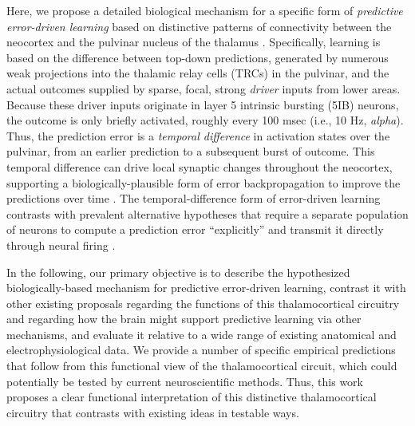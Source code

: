 \documentclass[11pt,twoside]{article}
\newif\myifpdf
\begin{document}
Here, we propose a detailed biological mechanism for a specific form of \emph{predictive error-driven learning} based on distinctive patterns of connectivity between the neocortex and the pulvinar nucleus of the thalamus \citep{ShermanGuillery06,UsreySherman18}.  Specifically, learning is based on the difference between top-down predictions, generated by numerous weak projections into the thalamic relay cells (TRCs) in the pulvinar, and the actual outcomes supplied by sparse, focal, strong \emph{driver} inputs from lower areas.  Because these driver inputs originate in layer 5 intrinsic bursting (5IB) neurons, the outcome is only briefly activated, roughly every 100 msec (i.e., 10 Hz, \emph{alpha}).  Thus, the prediction error is a \emph{temporal difference} in activation states over the pulvinar, from an earlier prediction to a subsequent burst of outcome.  This temporal difference can drive local synaptic changes throughout the neocortex, supporting a biologically-plausible form of error backpropagation to improve the predictions over time \citep{OReilly96,AckleyHintonSejnowski85,HintonMcClelland88,BengioMesnardFischerEtAl17,WhittingtonBogacz19,LillicrapSantoroMarrisEtAl20}. 
The temporal-difference form of error-driven learning contrasts with prevalent alternative hypotheses that require a separate population of neurons to compute a prediction error ``explicitly'' and transmit it directly through neural firing \citep{RaoBallard99,KawatoHayakawaInui93,Friston05,Friston10,OudenKokLange12,LotterKreimanCox16}.

In the following, our primary objective is to describe the hypothesized biologically-based mechanism for predictive error-driven learning, contrast it with other existing proposals regarding the functions of this thalamocortical circuitry and regarding how the brain might support predictive learning via other mechanisms, and evaluate it relative to a wide range of existing anatomical and electrophysiological data.  We provide a number of specific empirical predictions that follow from this functional view of the thalamocortical circuit, which could potentially be tested by current neuroscientific methods.  Thus, this work proposes a clear functional interpretation of this distinctive thalamocortical circuitry that contrasts with existing ideas in testable ways. 
\end{document}
